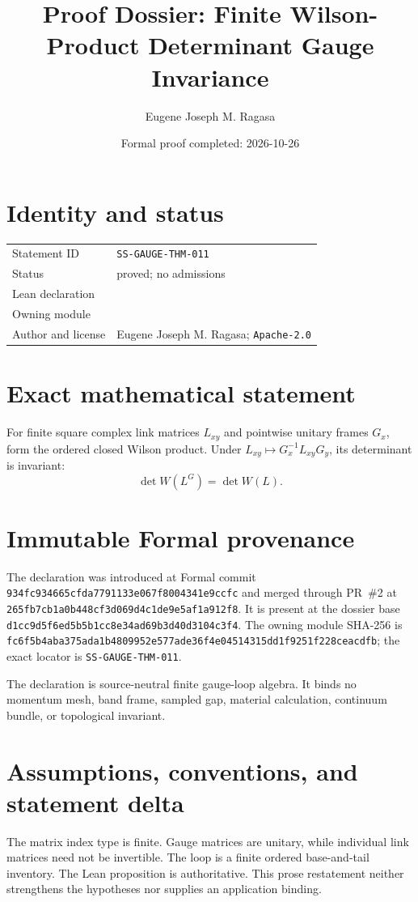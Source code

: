 \documentclass[11pt]{article}
\title{Proof Dossier: Finite Wilson-Product Determinant Gauge Invariance}
\author{Eugene Joseph M. Ragasa}
\date{Formal proof completed: 2026-10-26}
\begin{document}
\raggedright
\maketitle

\section{Identity and status}
\begin{tabularx}{\textwidth}{@{}lY@{}}
\toprule
Statement ID & \texttt{SS-GAUGE-THM-011} \\
Status & proved; no admissions \\
Lean declaration &  \\
Owning module &  \\
Author and license & Eugene Joseph M. Ragasa; \texttt{Apache-2.0} \\
\bottomrule
\end{tabularx}

\section{Exact mathematical statement}
For finite square complex link matrices $L_{xy}$ and pointwise unitary frames $G_x$, form the ordered closed Wilson product.  Under
$L_{xy}\mapsto G_x^{-1}L_{xy}G_y$, its determinant is invariant:
\[
 \det W(L^G)=\det W(L).
\]

\section{Immutable Formal provenance}
The declaration was introduced at Formal commit
\texttt{934fc934665cfda7791133e067f8004341e9ccfc} and merged through PR~\#2 at
\texttt{265fb7cb1a0b448cf3d069d4c1de9e5af1a912f8}.  It is present at the dossier base
\texttt{d1cc9d5f6ed5b5b1cc8e34ad69b3d40d3104c3f4}.  The owning module SHA-256 is
\texttt{fc6f5b4aba375ada1b4809952e577ade36f4e04514315dd1f9251f228ceacdfb}; the exact locator is \texttt{SS-GAUGE-THM-011}.

The declaration is source-neutral finite gauge-loop algebra.  It binds no momentum mesh, band frame, sampled gap, material calculation, continuum bundle, or topological invariant.

\section{Assumptions, conventions, and statement delta}
The matrix index type is finite.  Gauge matrices are unitary, while individual link matrices need not be invertible.  The loop is a finite ordered base-and-tail inventory.
The Lean proposition is authoritative.  This prose restatement neither strengthens the hypotheses
nor supplies an application binding.
\end{document}
